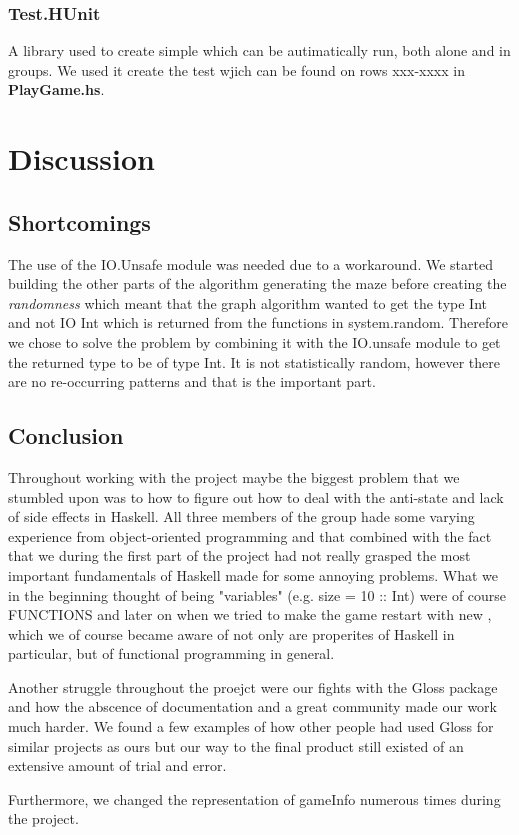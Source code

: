 \documentclass[12pt, a4paper]{article}
\begin{document}
\subsubsection{Test.HUnit}
A library used to create simple which can be autimatically run, both alone and in groups. We used it create the test wjich can be found on rows xxx-xxxx in \textbf{PlayGame.hs}. \cite{HUnit}

\newpage
\section{Discussion}
\subsection{Shortcomings}
The use of the IO.Unsafe module was needed due to a workaround. We started building the other parts of the algorithm generating the maze before creating the \textit{randomness} which meant that the graph algorithm wanted to get the type Int and not IO Int which is returned from the functions in system.random. Therefore we chose to solve the problem by combining it with the IO.unsafe module to get the returned type to be of type Int. It is not statistically random, however there are no re-occurring patterns and that is the important part.








\subsection{Conclusion}
Throughout working with the project maybe the biggest problem that we stumbled upon was to how to figure out how to deal with the anti-state and lack of side effects in Haskell. All three members of the group hade some varying experience from object-oriented programming and that combined with the fact that we during the first part of the project had not really grasped the most important fundamentals of Haskell made for some annoying problems. What we in the beginning thought of being "variables" (e.g. size = 10 :: Int) were of course FUNCTIONS and later on when we tried to make the game restart with new , which we of course became aware of not only are properites of Haskell in particular, but of functional programming in general. 

Another struggle throughout the proejct were our fights with the Gloss package and how the abscence of documentation and a great community made our work much harder. We found a few examples of how other people had used Gloss for similar projects as ours but our way to the final product still existed of an extensive amount of trial and error.

Furthermore, we changed the representation of gameInfo numerous times during the project. 



\end{document}
